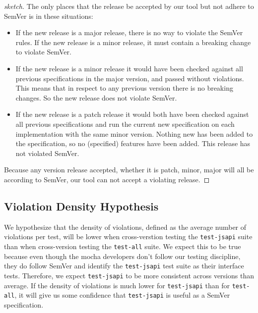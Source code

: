 \begin{proof}[sketch]
The only places that the release be accepted by our tool but not adhere
to SemVer is in these situations: 

\begin{itemize}

    \item If the new release is a major release, there is no way to
        violate the SemVer rules. If the new release is a minor release,
        it must contain a breaking change to violate SemVer. 

    \item If the new release is a minor release it would have been
        checked against all previous specifications in the major
        version, and passed without violations.  This means that in
        respect to any previous version there is no breaking changes. So
        the new release does not violate SemVer.

    \item If the new release is a patch release it would both have been
        checked against all previous specifications and run the current
        new specification on each implementation with the same minor
        version. Nothing new has been added to the specification, so no
        (specified) features have been added. This release has not
        violated SemVer.
\end{itemize}

Because any version release accepted, whether it is patch, minor, major
will all be according to SemVer, our tool can not accept a violating
release.
\end{proof}


\subsection{Violation Density Hypothesis}
We hypothesize that the density of violations, defined as the average
number of violations per test, will be lower when cross-verstion
testing the {\tt test-jsapi} suite than when cross-version testing the
{\tt test-all} suite. We expect this to be true because even though
the mocha developers don't follow our testing discipline, they do
follow SemVer and identify the {\tt test-jsapi} test suite as their
interface tests. Therefore, we expect {\tt test-jsapi} to be more
consistent across versions than average. If the density of violations
is much lower for {\tt test-jsapi} than for {\tt test-all}, it will
give us some confidence that {\tt test-jsapi} is useful as a SemVer
specification.

